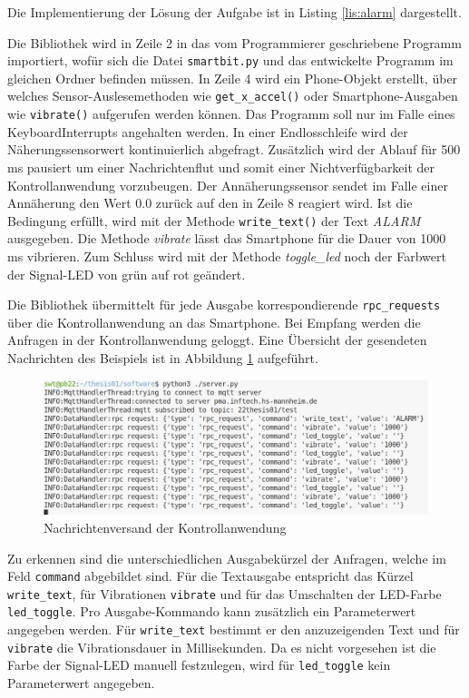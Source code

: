 \documentclass[11pt,a4paper]{report}
\begin{document}
Die Implementierung der Lösung der Aufgabe ist in Listing \ref{lis:alarm} dargestellt.
\lstset{language=python, captionpos=b, frame=single, numberstyle=\tiny, style=customcs}

Die Bibliothek wird in Zeile 2 in das vom Programmierer geschriebene Programm importiert, wofür sich die Datei \texttt{smartbit.py} und das entwickelte Programm im gleichen Ordner befinden müssen.
In Zeile 4 wird ein Phone-Objekt erstellt, über welches Sensor-Auslesemethoden wie \texttt{get\_x\_accel()} oder Smartphone-Ausgaben wie \texttt{vibrate()} aufgerufen werden können.
Das Programm soll nur im Falle eines KeyboardInterrupts angehalten werden.
In einer Endlosschleife wird der Näherungssensorwert kontinuierlich abgefragt.
Zusätzlich wird der Ablauf für 500 ms pausiert um einer Nachrichtenflut und somit einer Nichtverfügbarkeit der Kontrollanwendung vorzubeugen.
Der Annäherungssensor sendet im Falle einer Annäherung den Wert 0.0 zurück auf den in Zeile 8 reagiert wird.
Ist die Bedingung erfüllt, wird mit der Methode \texttt{write\_text()} der Text \textit{ALARM} ausgegeben.
Die Methode \textit{vibrate} lässt das Smartphone für die Dauer von 1000 ms vibrieren.
Zum Schluss wird mit der Methode \textit{toggle\_led} noch der Farbwert der Signal-LED von grün auf rot geändert.

Die Bibliothek übermittelt für jede Ausgabe korrespondierende \texttt{rpc\_requests} über die Kontrollanwendung an das Smartphone.
Bei Empfang werden die Anfragen in der Kontrollanwendung geloggt.
Eine Übersicht der gesendeten Nachrichten des Beispiels ist in Abbildung \ref{fig:req_controll_app} aufgeführt.
\begin{figure}[htbp]
  \centering
  \includegraphics[width=\textwidth]{images/server_requests}
  \caption{Nachrichtenversand der Kontrollanwendung}
  \label{fig:req_controll_app}
\end{figure}
Zu erkennen sind die unterschiedlichen Ausgabekürzel der Anfragen, welche im Feld \texttt{command} abgebildet sind.
Für die Textausgabe entspricht das Kürzel \texttt{write\_text}, für Vibrationen \texttt{vibrate} und für das Umschalten der LED-Farbe \texttt{led\_toggle}.
Pro Ausgabe-Kommando kann zusätzlich ein Parameterwert angegeben werden.
Für \texttt{write\_text} bestimmt er den anzuzeigenden Text und für \texttt{vibrate} die Vibrationsdauer in Millisekunden.
Da es nicht vorgesehen ist die Farbe der Signal-LED manuell festzulegen, wird für \texttt{led\_toggle} kein Parameterwert angegeben.
\end{document}

